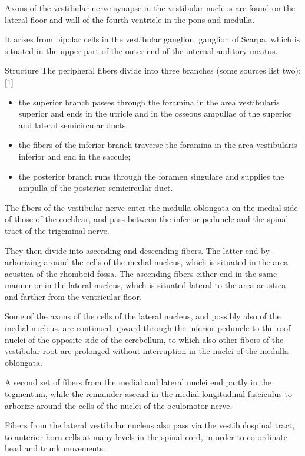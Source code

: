 \documentclass[]{book}
\providecommand{\tightlist}{%
  \setlength{\itemsep}{0pt}\setlength{\parskip}{0pt}}
\begin{document}
Axons of the vestibular nerve synapse in the vestibular nucleus are found on the lateral floor and wall of the fourth ventricle in the pons and medulla.

It arises from bipolar cells in the vestibular ganglion, ganglion of Scarpa, which is situated in the upper part of the outer end of the internal auditory meatus.

Structure The peripheral fibers divide into three branches (some sources list two):{[}1{]}

\begin{itemize}
\tightlist
\item
  the superior branch passes through the foramina in the area vestibularis superior and ends in the utricle and in the osseous ampullae of the superior and lateral semicircular ducts;
\item
  the fibers of the inferior branch traverse the foramina in the area vestibularis inferior and end in the saccule;
\item
  the posterior branch runs through the foramen singulare and supplies the ampulla of the posterior semicircular duct.
\end{itemize}

The fibers of the vestibular nerve enter the medulla oblongata on the medial side of those of the cochlear, and pass between the inferior peduncle and the spinal tract of the trigeminal nerve.

They then divide into ascending and descending fibers. The latter end by arborizing around the cells of the medial nucleus, which is situated in the area acustica of the rhomboid fossa. The ascending fibers either end in the same manner or in the lateral nucleus, which is situated lateral to the area acustica and farther from the ventricular floor.

Some of the axons of the cells of the lateral nucleus, and possibly also of the medial nucleus, are continued upward through the inferior peduncle to the roof nuclei of the opposite side of the cerebellum, to which also other fibers of the vestibular root are prolonged without interruption in the nuclei of the medulla oblongata.

A second set of fibers from the medial and lateral nuclei end partly in the tegmentum, while the remainder ascend in the medial longitudinal fasciculus to arborize around the cells of the nuclei of the oculomotor nerve.

Fibers from the lateral vestibular nucleus also pass via the vestibulospinal tract, to anterior horn cells at many levels in the spinal cord, in order to co-ordinate head and trunk movements.
\end{document}
